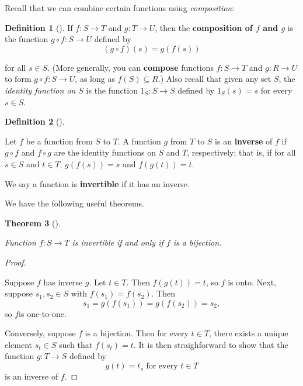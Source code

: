 \documentclass[10pt,]{book}
\newcommand{\terminology}[1]{\textbf{#1}}
\theoremstyle{plain}
\newtheorem{theorem}{Theorem}[section]
\theoremstyle{definition}
\newtheorem{definition}[theorem]{Definition}
\theoremstyle{definition}
\theoremstyle{definition}
\theoremstyle{definition}
\numberwithin{equation}{section}
\begin{document}
    Recall that we can combine certain functions using \emph{composition}:%
\begin{definition}[{}]\label{definition-10}
If \(f:S\to T\) and \(g:T\to U\), then the  \terminology{composition of \(f\) and \(g\)} is the function \(g\circ f: S\to U\) defined by
\begin{equation*}

      (g\circ f)(s)=g(f(s))
    
\end{equation*}

    for all \(s\in S\). (More generally, you can \terminology{compose} functions \(f:S\to T\) and \(g:R\to U\) to form \(g\circ f:S\to U\),  as long as \(f(S)\subseteq R\).) Also recall that given any set \(S\), the \emph{identity function on \(S\)} is the function \(1_S: S\to S\) defined by \(1_S(s)=s\) for every \(s\in S\).
  \label{notation-26}
\label{notation-27}
\end{definition}
\begin{definition}[{}]\label{definition-11}

        Let \(f\) be a function from \(S\) to \(T\). A function \(g\)
        from \(T\) to \(S\) is an \terminology{inverse} of \(f\) if \(g\circ f\) and
        \(f\circ g\) are the identity functions on \(S\) and \(T\),
        respectively; that is, if for all \(s\in S\) and \(t\in
        T\), \(g(f(s))=s\) and \(f(g(t))=t\). 

\par
We say a function is \terminology{invertible} if it has an inverse.%
\end{definition}
\par
We have the following useful theorems.%
\begin{theorem}[{}]\label{invbij}

        Function \(f:S\to T\) is invertible if and only if \(f\) is a bijection. 
\end{theorem}
\begin{proof}\hypertarget{proof-1}{}
Suppose \(f\) has inverse \(g\). Let \(t\in T\). Then \(f(g(t))=t\), so \(f\) is onto.  Next, suppose 
    \(s_1,s_2\in S\) with \(f(s_1)=f(s_2)\). Then %
\begin{equation*}
s_1=g(f(s_1))=g(f(s_2))=s_2,
\end{equation*}
 so \(f\)is one-to-one.%
\par
  Conversely, suppose \(f\) is a bijection.  Then for every \(t\in T\), there exists a unique element \(s_t\in S\) such that \(f(s_t)=t\). It is then straighforward to show that the function \(g:T\to S\) defined by %
\begin{equation*}
g(t)=t_s \text{ for every }t\in T
\end{equation*}
 is an inverse of \(f\).%
\end{proof}
\end{document}
